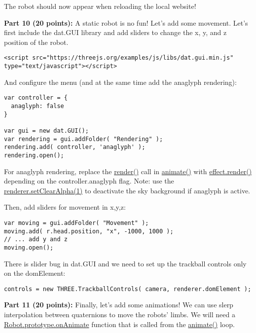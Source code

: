 \documentclass[10pt,oneside,onecolumn,letterpaper]{article}
\begin{document}
\noindent The robot should now appear when reloading the local website!


\vspace{.5cm}

\noindent\textbf{Part 10 (20 points):} A static robot is no fun! Let's add some movement. Let's first include the dat.GUI library and add sliders to change the x, y, and z position of the robot.

\begin{verbatim}
<script src="https://threejs.org/examples/js/libs/dat.gui.min.js" type="text/javascript"></script>
\end{verbatim}

\noindent And configure the menu (and at the same time add the anaglyph rendering):

\begin{verbatim}
var controller = {
  anaglyph: false
}

var gui = new dat.GUI();
var rendering = gui.addFolder( "Rendering" );
rendering.add( controller, 'anaglyph' );
rendering.open();
\end{verbatim}

\noindent For anaglyph rendering, replace the \url{render()} call in \url{animate()} with \url{effect.render()} depending on the controller.anaglyph flag. Note: use the \url{renderer.setClearAlpha(1)} to deactivate the sky background if anaglyph is active.

\vspace{.5cm}

\noindent Then, add sliders for movement in x,y,z:

\begin{verbatim}
var moving = gui.addFolder( "Movement" );
moving.add( r.head.position, "x", -1000, 1000 );
// ... add y and z
moving.open();
\end{verbatim}

\noindent There is slider bug in dat.GUI and we need to set up the trackball controls only on the domElement:

\begin{verbatim}
controls = new THREE.TrackballControls( camera, renderer.domElement );
\end{verbatim}

\vspace{.5cm}

\noindent\textbf{Part 11 (20 points):} Finally, let's add some animations! We can use slerp interpolation between quaternions to move the robots' limbs. We will need a \url{Robot.prototype.onAnimate} function that is called from the \url{animate()} loop.
\end{document}
